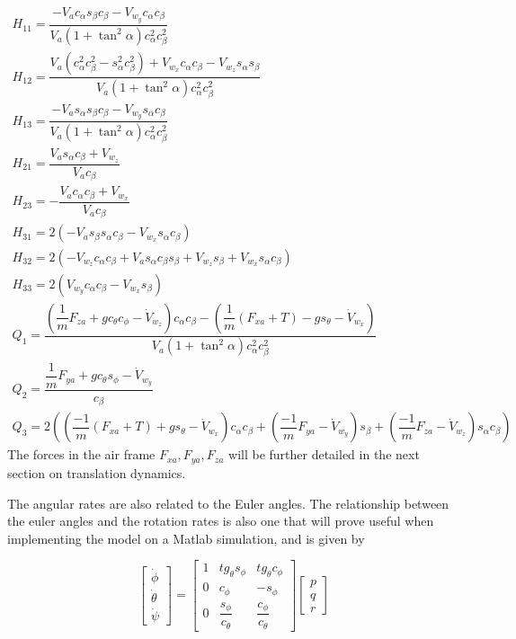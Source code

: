 \begin{gather*}
H_{11}=\dfrac{-V_a c_\alpha s_\beta  c_\beta - V_{w_y} c_\alpha c_\beta}{V_a(1+\tan^2\alpha)c^2_\alpha c^2_\beta}\\
H_{12}=\dfrac{V_a(c^2_\alpha c^2_\beta-s^2_\alpha c^2_\beta) + V_{w_x}c_\alpha c_\beta - V_{w_z}s_\alpha s_\beta}{V_a(1+\tan^2\alpha)c^2_\alpha c^2_\beta}\\
H_{13}=\dfrac{-V_a s_\alpha s_\beta  c_\beta - V_{w_y} s_\alpha c_\beta}{V_a(1+\tan^2\alpha)c^2_\alpha c^2_\beta}\\
H_{21}=\dfrac{V_a s_\alpha c_\beta + V_{w_z}}{V_a c_\beta}\\
H_{23}=-\dfrac{V_a c_\alpha c_\beta + V_{w_x}}{V_a c_\beta}\\
H_{31}=2 \left(-V_a s_\beta s_\alpha c_\beta - V_{w_x} s_\alpha c_\beta \right)\\
H_{32}=2\left( -V_{w_z} c_\alpha c_\beta + V_as_\alpha c_\beta s_\beta
 + V_{w_z}s_\beta + V_{w_x}s_\alpha c_\beta \right)\\
H_{33}=2\left(V_{w_y}c_\alpha c_\beta - V_{w_x}s_\beta\right)\\
Q_1=\dfrac{\left(\dfrac{1}{m}F_{za} + gc_\theta c_\phi - \dot{V}_{w_z} \right)c_\alpha c_\beta - \left(\dfrac{1}{m}(F_{xa} + T)-gs_\theta - \dot{V}_{w_x}\right)}{V_a(1+\tan^2\alpha)c^2_\alpha c^2_\beta}\\
Q_2=\dfrac{\dfrac{1}{m}F_{ya}+g c_\theta s_\phi-\dot{V}_{w_y}}{c_\beta}\\
Q_3=2 \left( \left(\dfrac{-1}{m}(F_{xa}+T) + g s_\theta - \dot{V}_{w_x} \right)c_\alpha c_\beta + \left( \dfrac{-1}{m}F_{ya} - \dot{V}_{w_y} \right)s_\beta + \left(\dfrac{-1}{m}F_{za} - \dot{V}_{w_z} \right)s_\alpha c_\beta \right)
\label{eq:Ra_dot}
\end{gather*}
The forces in the air frame $F_{xa}, F_{ya}, F_{za}$ will be further detailed in the next section on translation dynamics. 

The angular rates are also related to the Euler angles. The relationship between the euler angles and the rotation rates is also one that will prove useful when implementing the model on a Matlab simulation, and is given by

\begin{equation}
\begin{bmatrix}
\dot{\phi}\\
\dot{\theta}\\
\dot{\psi}
\end{bmatrix}
=
\begin{bmatrix}
1 & tg_\theta s_\phi & tg_\theta c_\phi\\
0 & c_\phi & -s_\phi\\
0 & \dfrac{s_\phi}{c_\theta} & \dfrac{c_\phi}{c_\theta}
\end{bmatrix}
\begin{bmatrix}
p\\
q\\
r
\end{bmatrix}
\label{eq:euler2omega}
\end{equation}

